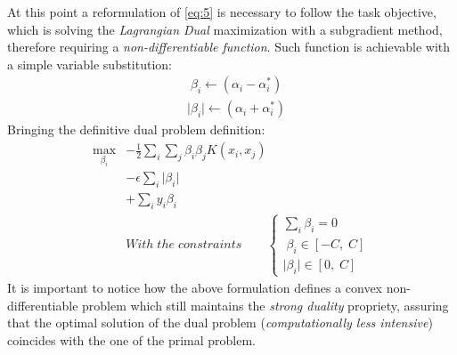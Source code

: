 \documentclass[12pt]{article}
\newcommand{\abs}[1]{\lvert#1\rvert}
\begin{document}
	At this point a reformulation of \eqref{eq:5} is necessary to follow the task objective, which is solving the \textit{Lagrangian Dual} maximization with a subgradient method, therefore requiring a \textit{non-differentiable function}. Such function is achievable with a simple variable substitution:
	\begin{equation*}
	    \begin{aligned}
	    &\;\beta_i \longleftarrow (\alpha_i - \alpha_i^*) \\
	    &\abs{\beta_i} \longleftarrow (\alpha_i + \alpha_i^*)
	    \end{aligned}
	\end{equation*}
	Bringing the definitive dual problem definition:
	\begin{equation}\label{eq:7}
	    \begin{aligned}
	    \max_{\beta_i} &- \frac{1}{2}\sum_i \sum_j \beta_i \beta_j K(x_i,x_j) \\
		&- \epsilon\sum_i\abs{\beta_i}\\
		&+ \sum_i y_i\beta_i\\
		&With\;the\;constraints\qquad
        \begin{cases}
            \sum_i \beta_i = 0 \\
            \;\beta_i\in[-C,\;C] \\
            \abs{\beta_i}\in[0,\;C]
        \end{cases}
        \end{aligned}
	\end{equation}
	It is important to notice how the above formulation defines a convex non-differentiable problem which still maintains the \textit{strong duality} propriety, assuring that the optimal solution of the dual problem (\textit{computationally less intensive}) coincides with the one of the primal problem. 





    \pagebreak
\end{document}
